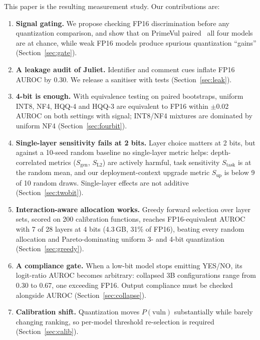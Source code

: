 \documentclass[conference]{IEEEtran}
\newcommand{\stask}{S_{\text{task}}}
\newcommand{\sgen}{S_{\text{gen}}}
\newcommand{\slt}{S_{\text{L2}}}
\newcommand{\sUp}{S_{\text{up}}}
\begin{document}
This paper is the resulting measurement study. Our contributions are:
\begin{enumerate}
  \item \textbf{Signal gating.} We propose checking FP16 discrimination before any quantization comparison, and show that on PrimeVul paired~\cite{ding2024primevul} all four models are at chance, while weak FP16 models produce spurious quantization ``gains'' (Section~\ref{sec:gate}).
  \item \textbf{A leakage audit of Juliet.} Identifier and comment cues inflate FP16 AUROC by 0.30. We release a sanitiser with tests (Section~\ref{sec:leak}).
  \item \textbf{4-bit is enough.} With equivalence testing on paired bootstraps, uniform INT8, NF4, HQQ-4 and HQQ-3 are equivalent to FP16 within $\pm$0.02 AUROC on both settings with signal; INT8/NF4 mixtures are dominated by uniform NF4 (Section~\ref{sec:fourbit}).
  \item \textbf{Single-layer sensitivity fails at 2 bits.} Layer choice matters at 2 bits, but against a 10-seed random baseline no single-layer metric helps: depth-correlated metrics ($\sgen$, $\slt$) are actively harmful, task sensitivity $\stask$ is at the random mean, and our deployment-context upgrade metric $\sUp$ is below 9 of 10 random draws. Single-layer effects are not additive (Section~\ref{sec:twobit}).
  \item \textbf{Interaction-aware allocation works.} Greedy forward selection over layer sets, scored on 200 calibration functions, reaches FP16-equivalent AUROC with 7 of 28 layers at 4 bits (4.3\,GB, 31\% of FP16), beating every random allocation and Pareto-dominating uniform 3- and 4-bit quantization (Section~\ref{sec:greedy}).
  \item \textbf{A compliance gate.} When a low-bit model stops emitting YES/NO, its logit-ratio AUROC becomes arbitrary: collapsed 3B configurations range from 0.30 to 0.67, one exceeding FP16. Output compliance must be checked alongside AUROC (Section~\ref{sec:collapse}).
  \item \textbf{Calibration shift.} Quantization moves $P(\text{vuln})$ substantially while barely changing ranking, so per-model threshold re-selection is required (Section~\ref{sec:calib}).
\end{enumerate}

\end{document}
